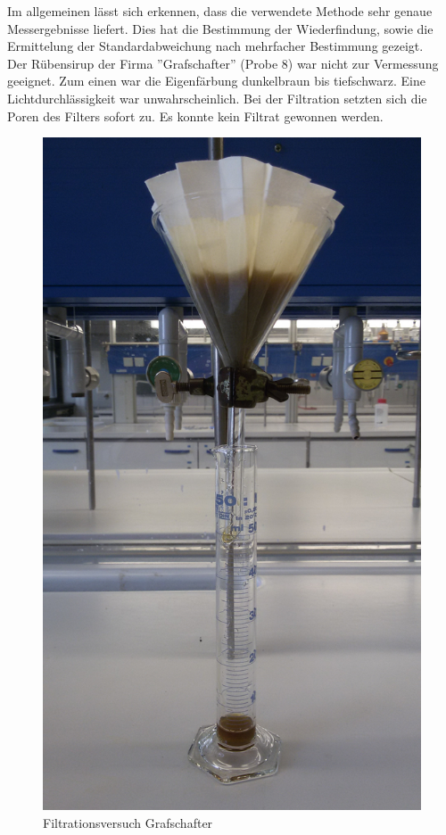 Im allgemeinen lässt sich erkennen, dass die verwendete Methode sehr genaue Messergebnisse liefert. Dies hat die Bestimmung der Wiederfindung, sowie die Ermittelung der Standardabweichung nach mehrfacher Bestimmung gezeigt.\\
Der Rübensirup der Firma ''Grafschafter'' (Probe 8) war nicht zur Vermessung geeignet. Zum einen war die Eigenfärbung dunkelbraun bis tiefschwarz. Eine Lichtdurchlässigkeit war unwahrscheinlich. Bei der Filtration setzten sich die Poren des Filters sofort zu. Es konnte kein Filtrat gewonnen werden.\\
\begin{figure}[htbp]
  \centering
  \includegraphics[width=1.00\textwidth]{../Bilder/20150427_153416.jpg}
  \caption{Filtrationsversuch Grafschafter}
  \label{fig:Grafschafter}
\end{figure}
